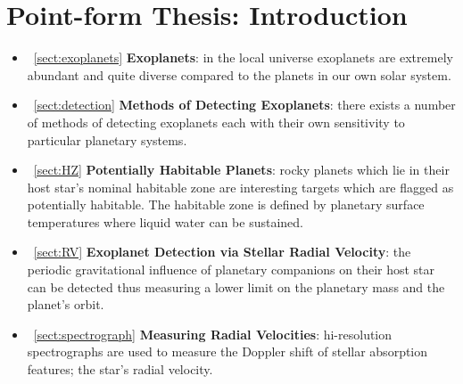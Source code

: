 \section{Point-form Thesis: Introduction}
\begin{itemize}
\renewcommand\labelitemi{--}
\item~\ref{sect:exoplanets} \textbf{Exoplanets}: in the local universe exoplanets are 
extremely abundant and quite diverse compared to the planets in our own solar system.
\item~\ref{sect:detection} \textbf{Methods of Detecting Exoplanets}: there exists a 
number of methods of detecting exoplanets each with their own sensitivity to particular 
planetary systems.
\item~\ref{sect:HZ} \textbf{Potentially Habitable Planets}: rocky planets which lie in 
their host star's nominal habitable zone are interesting targets which are flagged as 
potentially habitable. The habitable zone is defined by planetary surface temperatures 
where liquid water can be sustained.  
\item~\ref{sect:RV} \textbf{Exoplanet Detection via Stellar Radial Velocity}: the 
periodic gravitational influence of planetary companions on their host star can be 
detected thus measuring a lower limit on the planetary mass and the planet's orbit.
\item~\ref{sect:spectrograph} \textbf{Measuring Radial Velocities}: hi-resolution 
spectrographs are used to measure the Doppler shift of stellar absorption features; 
the star's radial velocity.
\end{itemize}
